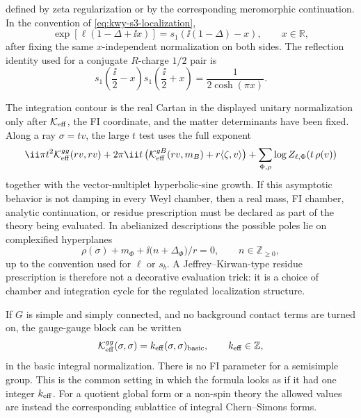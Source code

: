 defined by zeta regularization or by the corresponding meromorphic
continuation.  In the convention of \eqref{eq:kwy-s3-localization},
\begin{equation}
  \exp\!\left[\ell(1-\Delta+\ii x)\right]
  =
  s_1\!\left(\ii(1-\Delta)-x\right),
  \qquad x\in\mathbb R,
  \label{eq:ell-double-sine-round}
\end{equation}
after fixing the same \(x\)-independent normalization on both sides.  The
reflection identity used for a conjugate \(R\)-charge \(1/2\) pair is
\begin{equation}
  s_1\!\left(\frac{\ii}{2}-x\right)
  s_1\!\left(\frac{\ii}{2}+x\right)
  =
  \frac1{2\cosh(\pi x)} .
  \label{eq:double-sine-hyper-identity}
\end{equation}

The integration contour is the real Cartan in the displayed unitary
normalization only after \(\mathcal K_{\rm eff}\), the FI coordinate, and the
matter determinants have been fixed.  Along a ray \(\sigma=t v\), the large
\(t\) test uses the full exponent
\[
  \ii\pi t^2\mathcal K_{\rm eff}^{gg}(rv,rv)
  +2\pi\ii t\,
  \bigl(\mathcal K_{\rm eff}^{gB}(rv,m_B)
        +r\langle\zeta,v\rangle\bigr)
  +
  \sum_{\Phi,\rho}
  \log Z_{\ell,\Phi}\!\left(t\,\rho(v)\right)
\]
together with the vector-multiplet hyperbolic-sine growth.  If this asymptotic
behavior is not damping in every Weyl chamber, then a real mass, FI chamber,
analytic continuation, or residue prescription must be declared as part of the
theory being evaluated.  In abelianized descriptions the possible poles lie on
complexified hyperplanes
\[
  \rho(\sigma)+m_\Phi
  +\ii\bigl(n+\Delta_\Phi\bigr)/r=0,
  \qquad n\in\mathbb Z_{\ge0},
\]
up to the convention used for \(\ell\) or \(s_b\).  A Jeffrey--Kirwan-type
residue prescription is therefore not a decorative evaluation trick: it is a
choice of chamber and integration cycle for the regulated localization structure.

\begin{example}
\label{ex:s3-simple-simply-connected-cs-level}
If \(G\) is simple and simply connected, and no background contact terms are
turned on, the gauge-gauge block can be written
\[
  \mathcal K_{\rm eff}^{gg}(\sigma,\sigma)
  =
  k_{\rm eff}(\sigma,\sigma)_{\rm basic},
  \qquad k_{\rm eff}\in\mathbb Z,
\]
in the basic integral normalization.  There is no FI parameter for a semisimple
group.  This is the common setting in which the formula looks as if it had one
integer \(k_{\rm eff}\).  For a quotient global form or a non-spin theory the
allowed values are instead the corresponding sublattice of integral
Chern--Simons forms.
\end{example}

